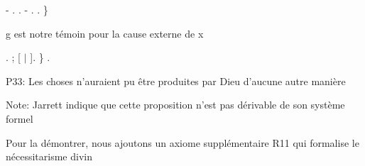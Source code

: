 \documentclass[10pt]{report}
\begin{document}
\begin{coqdoccode}
\coqdocindent{3.00em}
-  .  .\coqdoceol
\coqdocindent{3.00em}
-  .  .\coqdoceol
\coqdocindent{2.00em}
\}\coqdoceol
\coqdocindent{2.00em}
\coqdoceol
\coqdocindent{2.00em}
\begin{coqdoccomment}
\coqdocindent{0.50em}
g\coqdocindent{0.50em}
est\coqdocindent{0.50em}
notre\coqdocindent{0.50em}
témoin\coqdocindent{0.50em}
pour\coqdocindent{0.50em}
la\coqdocindent{0.50em}
cause\coqdocindent{0.50em}
externe\coqdocindent{0.50em}
de\coqdocindent{0.50em}
x\coqdocindent{0.50em}
\end{coqdoccomment}
\coqdoceol
\coqdocindent{2.00em}
\coqdoctac{\ensuremath{\exists}} .\coqdoceol
\coqdocindent{2.00em}
; [  \ensuremath{|}  ].\coqdoceol
\coqdocindent{1.00em}
\}\coqdoceol
\coqdocnoindent
{}.\coqdoceol
\coqdocemptyline
\coqdocnoindent
\begin{coqdoccomment}
\coqdocindent{0.50em}
P33:\coqdocindent{0.50em}
Les\coqdocindent{0.50em}
choses\coqdocindent{0.50em}
n'auraient\coqdocindent{0.50em}
pu\coqdocindent{0.50em}
être\coqdocindent{0.50em}
produites\coqdocindent{0.50em}
par\coqdocindent{0.50em}
Dieu\coqdocindent{0.50em}
d'aucune\coqdocindent{0.50em}
autre\coqdocindent{0.50em}
manière\coqdocindent{0.50em}
\end{coqdoccomment}
\coqdoceol
\coqdocnoindent
\begin{coqdoccomment}
\coqdocindent{0.50em}
Note:\coqdocindent{0.50em}
Jarrett\coqdocindent{0.50em}
indique\coqdocindent{0.50em}
que\coqdocindent{0.50em}
cette\coqdocindent{0.50em}
proposition\coqdocindent{0.50em}
n'est\coqdocindent{0.50em}
pas\coqdocindent{0.50em}
dérivable\coqdocindent{0.50em}
de\coqdocindent{0.50em}
son\coqdocindent{0.50em}
système\coqdocindent{0.50em}
formel\coqdocindent{0.50em}
\end{coqdoccomment}
\coqdoceol
\coqdocnoindent
\begin{coqdoccomment}
\coqdocindent{0.50em}
Pour\coqdocindent{0.50em}
la\coqdocindent{0.50em}
démontrer,\coqdocindent{0.50em}
nous\coqdocindent{0.50em}
ajoutons\coqdocindent{0.50em}
un\coqdocindent{0.50em}
axiome\coqdocindent{0.50em}
supplémentaire\coqdocindent{0.50em}
R11\coqdocindent{0.50em}
qui\coqdocindent{0.50em}
formalise\coqdocindent{0.50em}
le\coqdocindent{0.50em}
nécessitarisme\coqdocindent{0.50em}
divin\coqdocindent{0.50em}
\end{coqdoccomment}

\end{coqdoccode}
\end{document}
